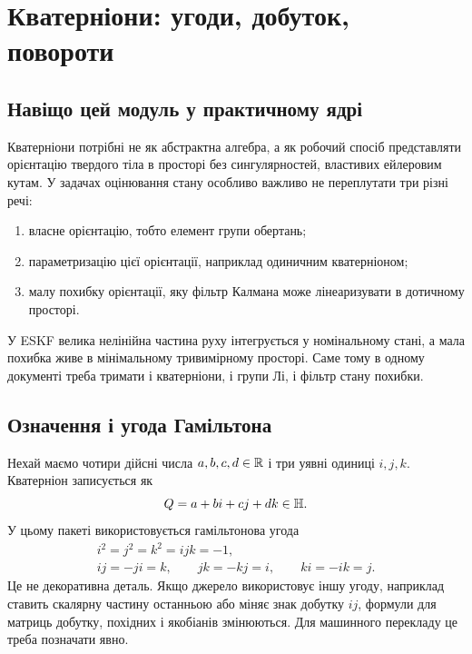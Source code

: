 \chapter{Кватерніони: угоди, добуток, повороти}


\section{Навіщо цей модуль у практичному ядрі}

Кватерніони потрібні не як абстрактна алгебра, а як робочий спосіб представляти орієнтацію твердого тіла в просторі без сингулярностей, властивих ейлеровим кутам. У задачах оцінювання стану особливо важливо не переплутати три різні речі:
\begin{enumerate}[leftmargin=2em]
\item власне орієнтацію, тобто елемент групи обертань;
\item параметризацію цієї орієнтації, наприклад одиничним кватерніоном;
\item малу похибку орієнтації, яку фільтр Калмана може лінеаризувати в дотичному просторі.
\end{enumerate}

У ESKF велика нелінійна частина руху інтегрується у номінальному стані, а мала похибка живе в мінімальному тривимірному просторі. Саме тому в одному документі треба тримати і кватерніони, і групи Лі, і фільтр стану похибки.

\section{Означення і угода Гамільтона}

Нехай маємо чотири дійсні числа $a,b,c,d\in\mathbb{R}$ і три уявні одиниці $i,j,k$. Кватерніон записується як
\begin{equation}
Q=a+bi+cj+dk\in\mathbb{H} .
\end{equation}
У цьому пакеті використовується гамільтонова угода
\begin{subequations}\label{eq:hamilton_algebra}
\begin{align}
i^2=j^2=k^2=ijk=-1,\\
ij=-ji=k,\qquad jk=-kj=i,\qquad ki=-ik=j.
\end{align}
\end{subequations}
Це не декоративна деталь. Якщо джерело використовує іншу угоду, наприклад ставить скалярну частину останньою або міняє знак добутку $ij$, формули для матриць добутку, похідних і якобіанів змінюються. Для машинного перекладу це треба позначати явно.

